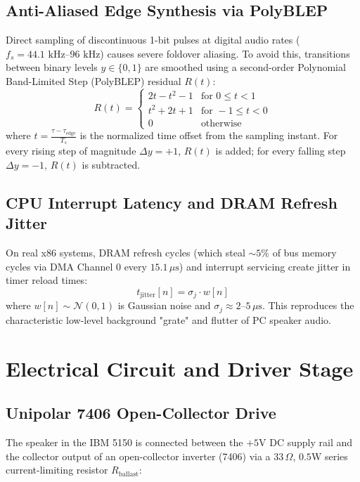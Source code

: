 \documentclass[11pt,a4paper]{article}
\begin{document}
\subsection{Anti-Aliased Edge Synthesis via PolyBLEP}
Direct sampling of discontinuous 1-bit pulses at digital audio rates ($f_s = 44.1\text{ kHz}\text{--}96\text{ kHz}$) causes severe foldover aliasing. To avoid this, transitions between binary levels $y \in \{0, 1\}$ are smoothed using a second-order Polynomial Band-Limited Step (PolyBLEP) residual $R(t)$:
\begin{equation}
R(t) = \begin{cases}
2t - t^2 - 1 & \text{for } 0 \le t < 1 \\
t^2 + 2t + 1 & \text{for } -1 \le t < 0 \\
0 & \text{otherwise}
\end{cases}
\end{equation}
where $t = \frac{\tau - \tau_{\text{edge}}}{T_s}$ is the normalized time offset from the sampling instant. For every rising step of magnitude $\Delta y = +1$, $R(t)$ is added; for every falling step $\Delta y = -1$, $R(t)$ is subtracted.

\subsection{CPU Interrupt Latency and DRAM Refresh Jitter}
On real x86 systems, DRAM refresh cycles (which steal $\sim 5\%$ of bus memory cycles via DMA Channel 0 every $15.1\,\mu\text{s}$) and interrupt servicing create jitter in timer reload times:
\begin{equation}
t_{\text{jitter}}[n] = \sigma_j \cdot w[n]
\end{equation}
where $w[n] \sim \mathcal{N}(0, 1)$ is Gaussian noise and $\sigma_j \approx 2\text{--}5\,\mu\text{s}$. This reproduces the characteristic low-level background "grate" and flutter of PC speaker audio.

\section{Electrical Circuit and Driver Stage}

\subsection{Unipolar 7406 Open-Collector Drive}
The speaker in the IBM 5150 is connected between the $+5\text{V}$ DC supply rail and the collector output of an open-collector inverter (7406) via a $33\,\Omega$, $0.5\text{W}$ series current-limiting resistor $R_{\text{ballast}}$:
\end{document}
